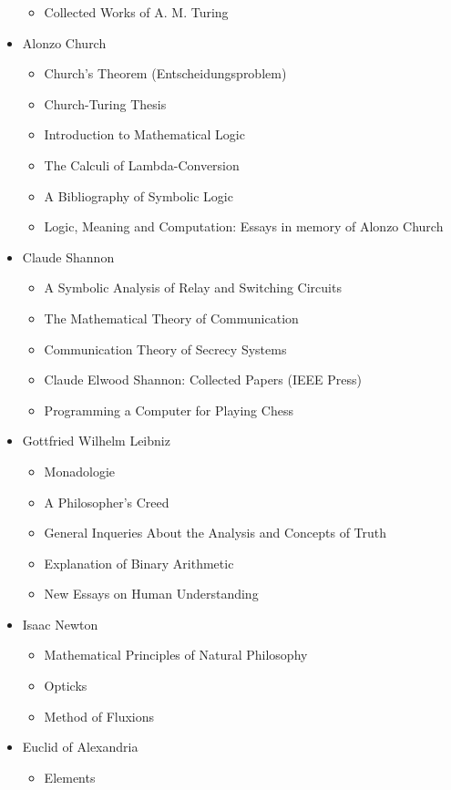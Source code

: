 \documentclass{article}
\begin{document}
\begin{itemize}
\begin{itemize}
		\item Collected Works of A. M. Turing
	\end{itemize}
	\item Alonzo Church
	\begin{itemize}
		\item Church's Theorem (Entscheidungsproblem)
		\item Church-Turing Thesis
		\item Introduction to Mathematical Logic
		\item The Calculi of Lambda-Conversion
		\item A Bibliography of Symbolic Logic
		\item Logic, Meaning and Computation: Essays in memory of Alonzo Church
	\end{itemize}
	\item Claude Shannon
	\begin{itemize}
		\item A Symbolic Analysis of Relay and Switching Circuits
		\item The Mathematical Theory of Communication
		\item Communication Theory of Secrecy Systems
		\item Claude Elwood Shannon: Collected Papers (IEEE Press)
		\item Programming a Computer for Playing Chess
	\end{itemize}
	\item Gottfried Wilhelm Leibniz
	\begin{itemize}
		\item Monadologie
		\item A Philosopher's Creed
		\item General Inqueries About the Analysis and Concepts of Truth
		\item Explanation of Binary Arithmetic
		\item New Essays on Human Understanding
	\end{itemize}
	\item Isaac Newton
	\begin{itemize}
		\item Mathematical Principles of Natural Philosophy
		\item Opticks
		\item Method of Fluxions
	\end{itemize}
	\item Euclid of Alexandria
	\begin{itemize}
		\item Elements

\end{itemize}
\end{itemize}
\end{document}

